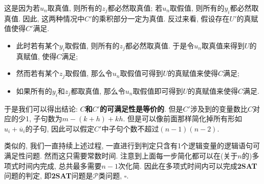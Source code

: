 \documentclass{article}
\begin{document}
\begin{homeworkProblem}
	这是因为若$u_n$取真值, 则所有的$z_j$都必然取真值; 若$u_n$取假值, 则所有的$y_i$都必然取真值. 因此, 这两种情况中$C'$的乘积部分一定为真值. 反过来看, 假设存在$U'$的真赋值使得$C'$满足.
	\begin{itemize}
		\item 此时若有某个$y_i$取假值, 则所有的$z_j$都必然取真值. 于是令$u_n$取真值来得到$U$的真赋值, 使得$C$满足;
		\item 然而若有某个$z_j$取假值, 那么令$u_n$取假值可得到$U$的真赋值来使得$C$满足;
		\item 如果所有的$y_i$和$z_j$都取真值, 那么令$u_n$取假值即可得到$U$的真赋值来使得$C$满足.
	\end{itemize}

	于是我们可以得出结论: \textbf{$C$和$C'$的可满足性是等价的}. 但是$C'$涉及到的变量数比$C$对应的少1, 子句数为$m-(k+h)+kh$. 但是可以像前面那样简化掉所有形如$u_i+\overline{u}_i$的子句, 因此可以假定$C'$中子句个数不超过$(n-1)(n-2)$.

	类似的, 我们一直持续上述过程, 一直进行到判定只含有1个逻辑变量的逻辑语句可满足性问题. 然而这只需要常数时间. 注意到上面每一步简化都可以在(关于$n$的)多项式时间内完成, 总共最多需要$n-1$次化简. 因此在多项式时间内可以完成\textbf{2SAT}问题的判定, 即\textbf{2SAT}问题是$\mathcal{P}$类问题, $\square$.
\end{homeworkProblem}

\pagebreak
\end{document}

